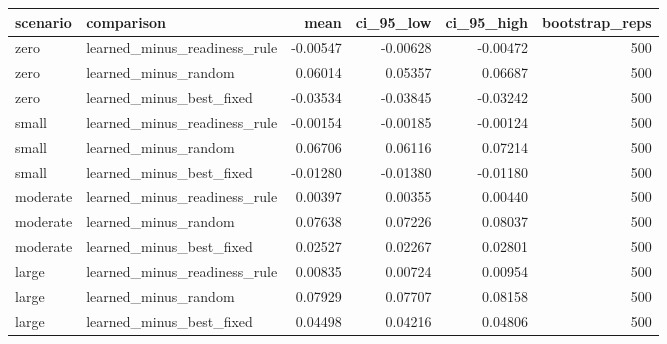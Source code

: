 \begin{tabular}{llrrrr}
\toprule
scenario & comparison & mean & ci\_95\_low & ci\_95\_high & bootstrap\_reps \\
\midrule
zero & learned\_minus\_readiness\_rule & -0.00547 & -0.00628 & -0.00472 & 500 \\
zero & learned\_minus\_random & 0.06014 & 0.05357 & 0.06687 & 500 \\
zero & learned\_minus\_best\_fixed & -0.03534 & -0.03845 & -0.03242 & 500 \\
small & learned\_minus\_readiness\_rule & -0.00154 & -0.00185 & -0.00124 & 500 \\
small & learned\_minus\_random & 0.06706 & 0.06116 & 0.07214 & 500 \\
small & learned\_minus\_best\_fixed & -0.01280 & -0.01380 & -0.01180 & 500 \\
moderate & learned\_minus\_readiness\_rule & 0.00397 & 0.00355 & 0.00440 & 500 \\
moderate & learned\_minus\_random & 0.07638 & 0.07226 & 0.08037 & 500 \\
moderate & learned\_minus\_best\_fixed & 0.02527 & 0.02267 & 0.02801 & 500 \\
large & learned\_minus\_readiness\_rule & 0.00835 & 0.00724 & 0.00954 & 500 \\
large & learned\_minus\_random & 0.07929 & 0.07707 & 0.08158 & 500 \\
large & learned\_minus\_best\_fixed & 0.04498 & 0.04216 & 0.04806 & 500 \\
\bottomrule
\end{tabular}

